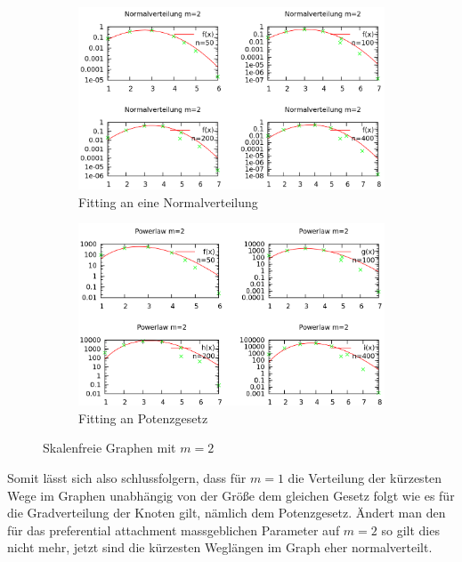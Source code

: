\documentclass[10pt]{article}
\begin{document}
\begin{figure}[htb!]
\begin{subfigure}{.5\textwidth}
  \centering
  \includegraphics[width=1\linewidth]{../Results/Normal_M2_logscale.png}
  \caption{Fitting an eine Normalverteilung}
  \label{fig:sfig1}
\end{subfigure}%
\begin{subfigure}{.5\textwidth}
  \centering
  \includegraphics[width=1\linewidth]{../Results/Power_M2_logscale.png}
  \caption{Fitting an Potenzgesetz}
  \label{fig:sfig2}
\end{subfigure}
\caption{Skalenfreie Graphen mit $m=2$}
\label{fig:m2}
\end{figure}

Somit lässt sich also schlussfolgern, dass für $m=1$ die Verteilung der kürzesten Wege im Graphen unabhängig von der Größe dem gleichen Gesetz folgt wie es für die Gradverteilung der Knoten gilt, nämlich dem Potenzgesetz. Ändert man den für das preferential attachment massgeblichen Parameter auf $m=2$ so gilt dies nicht mehr, jetzt sind die kürzesten Weglängen im Graph eher normalverteilt. 
\end{document}
